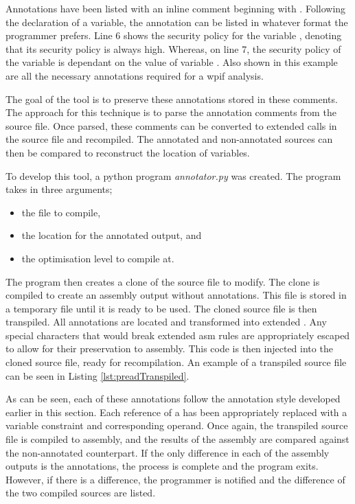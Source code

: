 Annotations have been listed with an inline comment beginning with . Following the declaration of a variable, the annotation can be listed in whatever format the programmer prefers. Line 6 shows the security policy for the variable , denoting that its security policy is always high. Whereas, on line 7, the security policy of the variable  is dependant on the value of variable . Also shown in this example are all the necessary annotations required for a wpif analysis.

The goal of the tool is to preserve these annotations stored in these comments. The approach for this technique is to parse the annotation comments from the source file. Once parsed, these comments can be converted to extended  calls in the source file and recompiled. The annotated and non-annotated sources can then be compared to reconstruct the location of variables.

To develop this tool, a python program \textit{annotator.py} was created. The program takes in three arguments;

\begin{itemize}
    \item the file to compile,
    \item the location for the annotated output, and
    \item the optimisation level to compile at. 
\end{itemize}

The program then creates a clone of the source file to modify. The clone is compiled to create an assembly output without annotations. This file is stored in a temporary file until it is ready to be used. The cloned source file is then transpiled. All annotations are located and transformed into extended . Any special characters that would break extended asm rules are appropriately escaped to allow for their preservation to assembly. This code is then injected into the cloned source file, ready for recompilation. An example of a transpiled source file can be seen in Listing \ref{lst:preadTranspiled}.



As can be seen, each of these annotations follow the annotation style developed earlier in this section. Each reference of a  has been appropriately replaced with a variable constraint and corresponding operand. Once again, the transpiled source file is compiled to assembly, and the results of the assembly are compared against the non-annotated counterpart. If the only difference in each of the assembly outputs is the annotations, the process is complete and the program exits. However, if there is a difference, the programmer is notified and the difference of the two compiled sources are listed.


